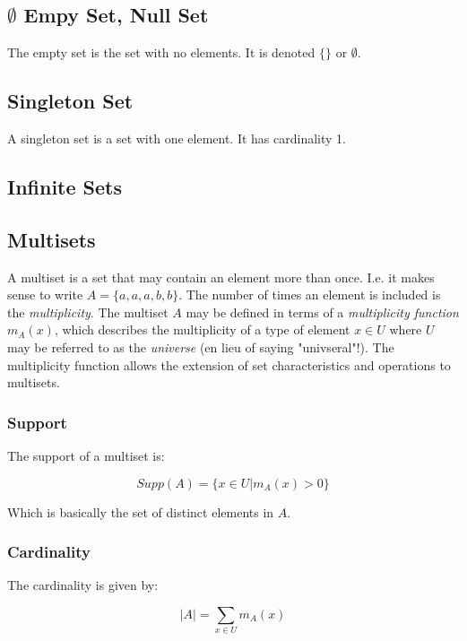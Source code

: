 \subsection{$\emptyset$ Empy Set, Null Set}
The empty set is the set with no elements. It is denoted $\{\}$ or $\emptyset$. 

\subsection{Singleton Set}
A singleton set is a set with one element. It has cardinality 1.

\subsection{Infinite Sets}

\subsection{Multisets}
A multiset is a set that may contain an element more than once. I.e. it makes sense to write $A=\{a,a,a,b,b\}$. The number of times an element is included is the \textit{multiplicity}. The multiset $A$ may be defined in terms of a \textit{multiplicity function} $m_A(x)$, which describes the multiplicity of a type of element $x\in U$ where $U$ may be referred to as the \textit{universe} (en lieu of saying "univseral"!). The multiplicity function allows the extension of set characteristics and operations to multisets.

\subsubsection{Support}
The support of a multiset is:

\begin{equation}
Supp(A) = \{ x\in U | 	m_A(x)>0\}
\end{equation} 

Which is basically the set of distinct elements in $A$.

\subsubsection{Cardinality}

The cardinality is given by:

\begin{equation}
|A| = \sum_{x\in U} m_A(x)
\end{equation}

